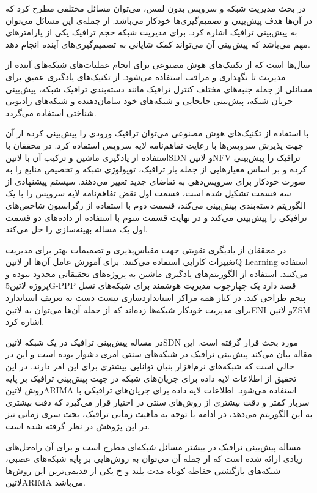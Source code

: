 
در بحث مدیریت شبکه و سرویس بدون لمس، می‌توان مسائل مختلفی مطرح کرد که در آن‌ها هدف پیش‌بینی و تصمیم‌گیری‌ها خودکار می‌باشد. از جمله‌ی این مسائل می‌توان به پیش‌بینی ترافیک اشاره کرد.
برای مدیریت شبکه حجم ترافیک یکی از پارامترهای مهم می‌باشد که پیش‌بینی آن می‌تواند کمک شایانی به تصمیم‌گیری‌های آینده انجام دهد.

سال‌ها است که از تکنیک‌های هوش مصنوعی برای انجام عملیات‌های شبکه‌های آینده از مدیریت تا نگهداری و مراقب استفاده می‌شود. از تکنیک‌های یادگیری عمیق
برای مسائلی از جمله جنبه‌های مختلف کنترل ترافیک مانند دسته‌بندی ترافیک شبکه، پیش‌بینی جریان شبکه، پیش‌بینی جابجایی
و شبکه‌های خود سامان‌دهنده و شبکه‌های رادیویی شناختی
استفاده می‌گردد. 

با استفاده از تکنیک‌های هوش مصنوعی می‌توان ترافیک ورودی را پیش‌بینی کرده از آن جهت پذیرش سرویس‌ها با رعایت تفاهم‌نامه لایه سرویس استفاده کرد. 
در  محققان با استفاده از یادگیری ماشین و ترکیب آن با ‌لاتین{SDN} و ‌لاتین{NFV} ترافیک را پیش‌بینی کرده و بر اساس معیارهایی از جمله بار ترافیک،
توپولوژی شبکه و تخصیص منابع را به صورت خودکار برای سرویس‌دهی به تقاضای جدید تغییر می‌دهند. سیستم پیشنهادی  از سه قسمت تشکیل شده است، قسمت اول
نقض تفاهم‌نامه لایه سرویس را با یک الگوریتم دسته‌بندی پیش‌بینی می‌کند، قسمت دوم با استفاده از رگراسیون شاخص‌های ترافیکی را پیش‌بینی می‌کند و در نهایت قسمت سوم با استفاده از
داده‌های دو قسمت اول یک مساله بهینه‌سازی را حل می‌کند.

در  محققان از یادیگری تقویتی جهت مقیاس‌پذیری و تصمیمات بهتر برای مدیریت تغییرات کارایی استفاده می‌کنند. برای آموزش عامل آن‌ها از ‌لاتین{Q Learning}
استفاده می‌کنند. استفاده از الگوریتم‌های یادگیری ماشین به پروژه‌های تحقیقاتی محدود نبوده و پروژه ‌لاتین{5G-PPP} قصد دارد یک چهارچوب مدیریت هوشمند برای شبکه‌های نسل پنجم
طراحی کند. در کنار همه مراکز استانداردسازی نیست دست به تعریف استاندارد برای مدیریت خودکار شبکه‌ها زده‌اند که از جمله آن‌ها می‌توان به ‌لاتین{ENI} و ‌لاتین{ZSM} اشاره کرد.

در  مساله پیش‌بینی ترافیک در یک شبکه ‌لاتین{SDN} مورد بحث قرار گرفته است. این مقاله بیان می‌کند پیش‌بینی ترافیک در
شبکه‌های سنتی امری دشوار بوده است و این در حالی است که شبکه‌های نرم‌افزار بنیان توانایی بیشتری برای این امر دارند. در این تحقیق از اطلاعات لایه
داده برای جریان‌های شبکه در جهت پیش‌بینی ترافیک بر پایه روش ‌لاتین{ARIMA} استفاده می‌شود.
اطلاعات لایه داده برای جریان‌های ترافیکی با سربار کمتر و دقت بیشتری از روش‌های سنتی در اختیار قرار می‌گیرد که دقت بیشتری به این الگوریتم می‌دهد،
در ادامه با توجه به ماهیت زمانی ترافیک، بحث سری زمانی نیز در این پژوهش در نظر گرفته شده است.

مساله پیش‌بینی ترافیک در بیشتر مسائل شبکه‌ای مطرح است و برای آن راه‌حل‌های زیادی ارائه شده است که از جمله آن می‌توان به روش‌هایی بر پایه شبکه‌های عصبی،
شبکه‌های بازگشتی حفاظه کوتاه مدت بلند و ‌خ
یکی از قدیمی‌ترین این روش‌ها ‌لاتین{ARIMA} می‌باشد.
